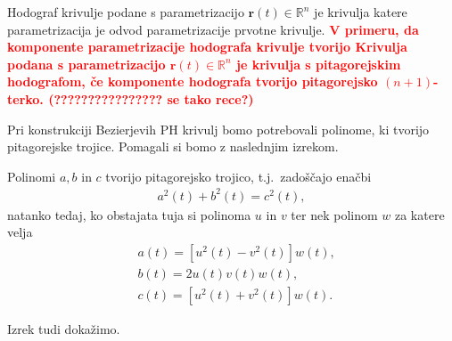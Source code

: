\documentclass[isrm2, tisk]{fmfdelo}
\newcommand{\R}{\mathbb R}
\newcommand{\mycomment}[1]{\textbf{\textcolor{red}{#1}}}
\begin{document}
    \begin{definicija}
        Hodograf krivulje podane s parametrizacijo $\mathbf{r}(t)\in \R^n$ je krivulja katere parametrizacija je odvod parametrizacije prvotne krivulje.
        \mycomment{V primeru, da komponente parametrizacije hodografa krivulje tvorijo
        Krivulja podana s parametrizacijo $\mathbf{r}(t)\in \R^n$ je krivulja s pitagorejskim hodografom, če komponente hodografa tvorijo pitagorejsko $(n+1)$-terko. (???????????????? se tako rece?)}
    \end{definicija}

    Pri konstrukciji Bezierjevih PH krivulj bomo potrebovali polinome, ki tvorijo pitagorejske trojice.
    Pomagali si bomo z naslednjim izrekom.

    \begin{izrek}              %
        Polinomi $a,b$ in $c$ tvorijo pitagorejsko trojico, t.j.\ zadoščajo enačbi
        \vspace{-0.3cm}
        \begin{align}
            a^2(t)+b^2(t)=c^2(t), \label{eq:abc}
        \end{align}
        natanko tedaj, ko obstajata tuja si polinoma $u$ in $v$ ter nek polinom  $w$ za katere velja
        \vspace{-0.3cm}
        \begin{align}
            &a(t)=[u^2(t)-v^2(t)]w(t), \nonumber \\
            &b(t)=2u(t)v(t)w(t),        \nonumber \\
            &c(t)=[u^2(t)+v^2(t)]w(t). \label{eq:uvw}
        \end{align}
    \end{izrek}

    Izrek tudi dokažimo.
\end{document}
